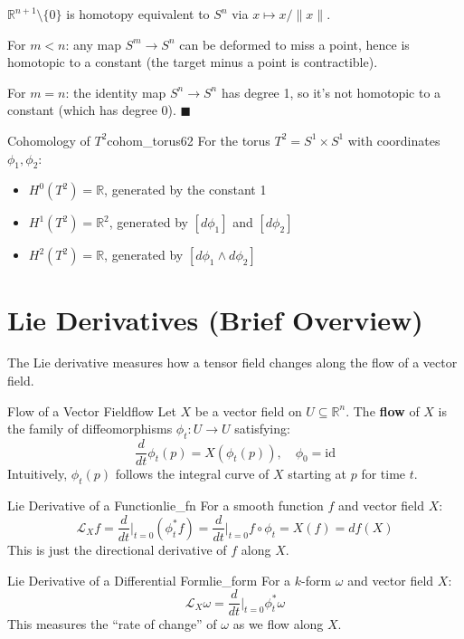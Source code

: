 \documentclass[11pt, letterpaper, openany]{book}
\renewenvironment{proof}[1][\proofname]{%
  \tcolorbox[blanker, breakable, left=1em,
    before skip=1em, after skip=1em,
    borderline west={2pt}{0pt}{MagicTeal!50},
    colback=MagicCream,
    before upper={\textcolor{MagicTeal}{\sffamily\bfseries #1.}\space}
  ]%
}{%
  \hfill\textcolor{MagicTeal}{\ensuremath{\blacksquare}}\endtcolorbox%
}
\begin{document}
\begin{proof}[Sketch]
$\mathbb{R}^{n+1} \setminus \{0\}$ is homotopy equivalent to $S^n$ via $x \mapsto x/\|x\|$.

For $m < n$: any map $S^m \to S^n$ can be deformed to miss a point, hence is homotopic to a constant (the target minus a point is contractible).

For $m = n$: the identity map $S^n \to S^n$ has degree 1, so it's not homotopic to a constant (which has degree 0).
\end{proof}

\begin{thm}{Cohomology of $T^2$}{cohom_torus62}
For the torus $T^2 = S^1 \times S^1$ with coordinates $\phi_1, \phi_2$:
\begin{itemize}
    \item $H^0(T^2) = \mathbb{R}$, generated by the constant 1
    \item $H^1(T^2) = \mathbb{R}^2$, generated by $[d\phi_1]$ and $[d\phi_2]$
    \item $H^2(T^2) = \mathbb{R}$, generated by $[d\phi_1 \wedge d\phi_2]$
\end{itemize}
\end{thm}

\section{Lie Derivatives (Brief Overview)}

The Lie derivative measures how a tensor field changes along the flow of a vector field.

\begin{defn}{Flow of a Vector Field}{flow}
Let $X$ be a vector field on $U \subseteq \mathbb{R}^n$. The \textbf{flow} of $X$ is the family of diffeomorphisms $\phi_t: U \to U$ satisfying:
\[\frac{d}{dt} \phi_t(p) = X(\phi_t(p)), \quad \phi_0 = \text{id}\]
Intuitively, $\phi_t(p)$ follows the integral curve of $X$ starting at $p$ for time $t$.
\end{defn}

\begin{defn}{Lie Derivative of a Function}{lie_fn}
For a smooth function $f$ and vector field $X$:
\[\mathcal{L}_X f = \frac{d}{dt}\Big|_{t=0} (\phi_t^* f) = \frac{d}{dt}\Big|_{t=0} f \circ \phi_t = X(f) = df(X)\]
This is just the directional derivative of $f$ along $X$.
\end{defn}

\begin{defn}{Lie Derivative of a Differential Form}{lie_form}
For a $k$-form $\omega$ and vector field $X$:
\[\mathcal{L}_X \omega = \frac{d}{dt}\Big|_{t=0} \phi_t^* \omega\]
This measures the ``rate of change'' of $\omega$ as we flow along $X$.
\end{defn}
\end{document}
